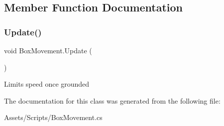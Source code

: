 \subsection{Member Function Documentation}
\mbox{\label{class_box_movement_ac523de4864d05c027a26c002feb0ddab}} 
\subsubsection{\texorpdfstring{Update()}{Update()}}
{\footnotesize\ttfamily void Box\+Movement.\+Update (\begin{DoxyParamCaption}{ }\end{DoxyParamCaption})\hspace{0.3cm}{\ttfamily [inline]}}

Limits speed once grounded 

The documentation for this class was generated from the following file\+:\begin{DoxyCompactItemize}
\item 
Assets/\+Scripts/Box\+Movement.\+cs\end{DoxyCompactItemize}
